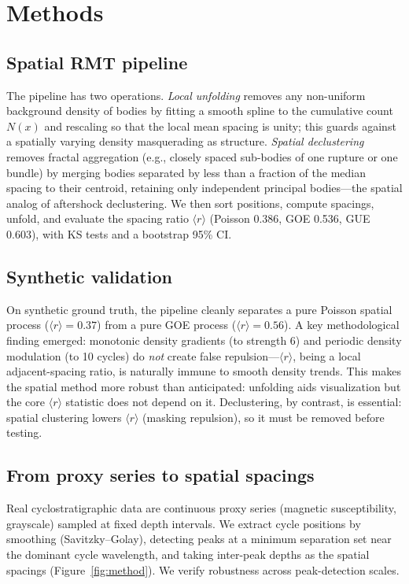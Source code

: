 \documentclass[12pt,a4paper]{article}
\begin{document}
\section{Methods}

\subsection{Spatial RMT pipeline}
The pipeline has two operations. \emph{Local unfolding} removes any non-uniform background density of bodies by fitting a smooth spline to the cumulative count $N(x)$ and rescaling so that the local mean spacing is unity; this guards against a spatially varying density masquerading as structure. \emph{Spatial declustering} removes fractal aggregation (e.g., closely spaced sub-bodies of one rupture or one bundle) by merging bodies separated by less than a fraction of the median spacing to their centroid, retaining only independent principal bodies---the spatial analog of aftershock declustering. We then sort positions, compute spacings, unfold, and evaluate the spacing ratio $\langle r\rangle$ \citep{atas2013} (Poisson 0.386, GOE 0.536, GUE 0.603), with KS tests and a bootstrap 95\% CI.

\subsection{Synthetic validation}
On synthetic ground truth, the pipeline cleanly separates a pure Poisson spatial process ($\langle r\rangle=0.37$) from a pure GOE process ($\langle r\rangle=0.56$). A key methodological finding emerged: monotonic density gradients (to strength 6) and periodic density modulation (to 10 cycles) do \emph{not} create false repulsion---$\langle r\rangle$, being a local adjacent-spacing ratio, is naturally immune to smooth density trends. This makes the spatial method more robust than anticipated: unfolding aids visualization but the core $\langle r\rangle$ statistic does not depend on it. Declustering, by contrast, is essential: spatial clustering lowers $\langle r\rangle$ (masking repulsion), so it must be removed before testing.

\subsection{From proxy series to spatial spacings}
Real cyclostratigraphic data are continuous proxy series (magnetic susceptibility, grayscale) sampled at fixed depth intervals. We extract cycle positions by smoothing (Savitzky--Golay), detecting peaks at a minimum separation set near the dominant cycle wavelength, and taking inter-peak depths as the spatial spacings (Figure~\ref{fig:method}). We verify robustness across peak-detection scales.
\end{document}

